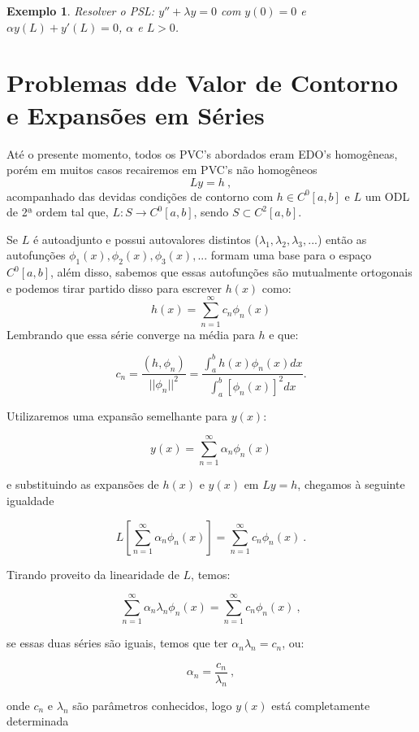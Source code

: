 \documentclass[a4paper,portuguese,9pt,final]{extarticle}
\newtheorem{example}{Exemplo}[section]
\begin{document}
\begin{multicols*}{2}
\begin{itemize}
        \begin{example}	
            Resolver o PSL: $y'' + \lambda y = 0$ com $y(0) = 0$ e $\alpha y(L) + y'(L) = 0$, $\alpha$ e $L>0$.   
        \end{example}
\section{Problemas dde Valor de Contorno e Expansões em Séries}

    Até o presente momento, todos os PVC's abordados eram EDO's homogêneas, porém em muitos casos recairemos em PVC's não homogêneos
    $$Ly=h \ ,$$
    acompanhado das devidas condições de contorno com $ h \in C^{0}[a,b] $ e $ L $ um ODL de 2ª ordem tal que, $ L:S \to C^{0}[a,b] $, sendo $ S \subset C^{2}[a,b] $.


    Se $ L $ é autoadjunto e possui autovalores distintos ($ \lambda_{1}, \lambda_{2}, \lambda_{3}, ... $) então as autofunções $ \phi_{1}(x), \phi_{2}(x), \phi_{3}(x),... $ formam uma base para o espaço $ C^{0}[a,b] $, além disso, sabemos que essas autofunções são mutualmente ortogonais e podemos tirar partido disso para escrever $ h(x) $ como:
    $$ h(x)=\sum_{n=1}^{\infty} c_{n}\phi_{n}(x)$$ 
   Lembrando que essa série converge na média para $h$ e que:

    $$ c_{n}=\frac{(h,\phi_{n})}{||\phi_{n}||^{2}} = \frac{\displaystyle\int_{a}^{b} h(x)\phi_{n}(x)dx}{\displaystyle\int_{a}^{b} [\phi_{n}(x)]^{2}dx}.$$


    Utilizaremos uma expansão semelhante para $ y(x) $:

    $$\displaystyle y(x)=\sum_{n=1}^{\infty} \alpha_{n}\phi_{n}(x)$$

    e substituindo as expansões de $ h(x) $ e $ y(x) $ em $ Ly=h $, chegamos à seguinte igualdade

    $$\displaystyle L\left[\sum_{n=1}^{\infty}\alpha_{n}\phi_{n}(x)\right] = \sum_{n=1}^{\infty}c_{n}\phi_{n}(x)  \ . $$



    Tirando proveito da linearidade de $ L $, temos:

    $$\displaystyle \sum_{n=1}^{\infty}\alpha_{n}\lambda_{n}\phi_{n}(x) = \sum_{n=1}^{\infty}c_{n}\phi_{n}(x)  \ , $$ 

    se essas duas séries são iguais, temos que ter $ \alpha_{n}\lambda_{n}=c_{n} $, ou:

    $$\alpha_{n}=\frac{c_{n}}{\lambda_{n}} \ ,$$

    onde $ c_{n} $ e $ \lambda_{n} $ são parâmetros conhecidos, logo $ y(x) $ está completamente determinada


\end{itemize}
\end{multicols*}
\end{document}
